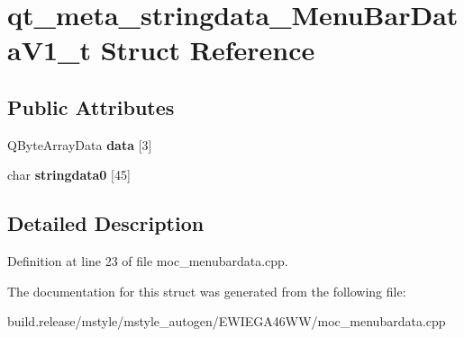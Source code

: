 \hypertarget{structqt__meta__stringdata___menu_bar_data_v1__t}{}\section{qt\+\_\+meta\+\_\+stringdata\+\_\+\+Menu\+Bar\+Data\+V1\+\_\+t Struct Reference}
\label{structqt__meta__stringdata___menu_bar_data_v1__t}
\subsection*{Public Attributes}
\begin{DoxyCompactItemize}
\item 
\mbox{\label{structqt__meta__stringdata___menu_bar_data_v1__t_a5f84f8a8fccb6392df19340356b60ec9}} 
Q\+Byte\+Array\+Data {\bfseries data} \mbox{[}3\mbox{]}
\item 
\mbox{\label{structqt__meta__stringdata___menu_bar_data_v1__t_a5f2823a2d7381752c1f30c4896cc6358}} 
char {\bfseries stringdata0} \mbox{[}45\mbox{]}
\end{DoxyCompactItemize}


\subsection{Detailed Description}


Definition at line 23 of file moc\+\_\+menubardata.\+cpp.



The documentation for this struct was generated from the following file\+:\begin{DoxyCompactItemize}
\item 
build.\+release/mstyle/mstyle\+\_\+autogen/\+E\+W\+I\+E\+G\+A46\+W\+W/moc\+\_\+menubardata.\+cpp\end{DoxyCompactItemize}
